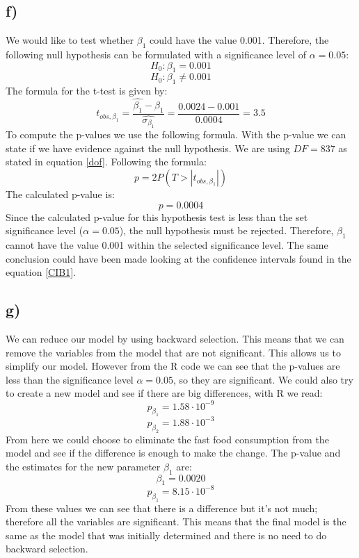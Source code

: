 \subsection{f)}
We would like to test whether $\beta_1$ could have the value 0.001. Therefore, the following null hypothesis can be formulated
with a significance level of $\alpha=0.05$:
\[H_0: \beta_1 =0.001\]
\[H_0: \beta_1 \neq 0.001\]
The formula for the t-test is given by: 
\[ t_{obs,\beta_1}=\frac{\hat{\beta_1}-\beta_1}{\hat{\sigma_{\beta_1}}} = \frac{0.0024-0.001}{0.0004}=3.5\]
To compute the p-values we use the following formula. With the p-value we can state if we have evidence against the null hypothesis. We are using $DF=837$ as stated in equation \ref{dof}. Following the formula:
\[p=2P(T>|t_{obs,\beta_1}|) \]
The calculated p-value is:
\[ p=0.0004 \]
Since the calculated p-value for this hypothesis test is less than the set significance level ($\alpha=0.05$), the null hypothesis must be rejected. Therefore, $\beta_1$ cannot have the value 0.001 within the selected significance level. The same conclusion could have been made looking at the confidence intervals found in the equation \ref{CIB1}.

\subsection{g)}
We can reduce our model by using backward selection. This means that we can remove the variables from the model that are not significant. This allows us to simplify our model. However from the R code we can see that the p-values are less than the significance level $\alpha = 0.05$, so they are significant. We could also try to create a new model and see if there are big differences, with R we read:
\[ p_{\beta_1} = 1.58 \cdot 10^{-9}\]
\[ p_{\beta_2} = 1.88 \cdot 10^{-3}\]
From here we could choose to eliminate the fast food consumption from the model and see if the difference is enough to make the change. The p-value and the estimates for the new parameter $\beta_1$ are:
\[ \beta_1 = 0.0020\]
\[ p_{\beta_1} = 8.15 \cdot 10^{-8}\]
From these values we can see that there is a difference but it's not much; therefore  all the variables are significant. This means that the final model is the same as the model that was initially determined and there is no need to do backward selection.

